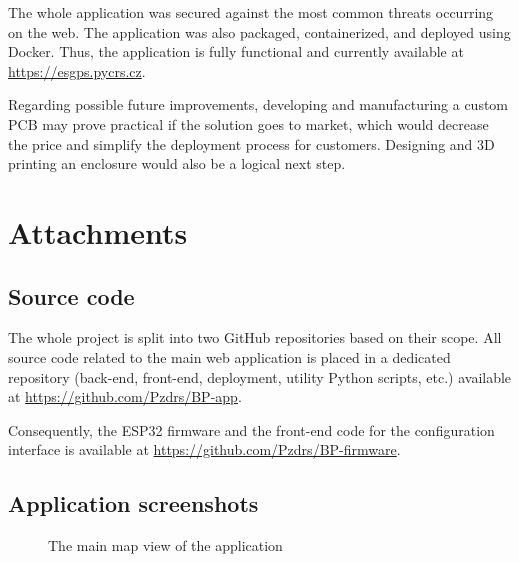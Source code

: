 \documentclass[FM,BP,EN,fonts]{tulthesis}
\begin{document}
The whole application was secured against the most common threats occurring on the web. The application was also packaged, containerized, and deployed using Docker. Thus, the application is fully functional and currently available at \href{https://esgps.pycrs.cz}{https://esgps.pycrs.cz}.

Regarding possible future improvements, developing and manufacturing a custom PCB may prove practical if the solution goes to market, which would decrease the price and simplify the deployment process for customers. Designing and 3D printing an enclosure would also be a logical next step.

\nocite{*}
\printbibliography[title={References}] %

\appendix
\chapter{Attachments}
\section{Source code}
The whole project is split into two GitHub repositories based on their scope. All source code related to the main web application is placed in a dedicated repository (back-end, front-end, deployment, utility Python scripts, etc.) available at \href{https://github.com/Pzdrs/BP-app}{https://github.com/Pzdrs/BP-app}. 

Consequently, the ESP32 firmware and the front-end code for the configuration interface is available at \href{https://github.com/Pzdrs/BP-firmware}{https://github.com/Pzdrs/BP-firmware}.

\section{Application screenshots}
\label{sec:app-screenshots}
\begin{figure}[htbp]
    \centering
    \caption{The main map view of the application}
\end{figure}
\end{document}
